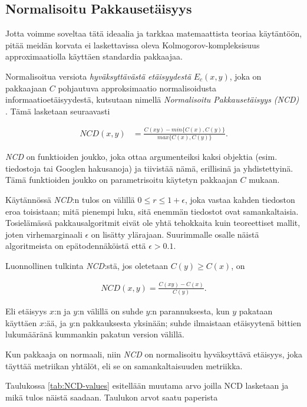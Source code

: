 \documentclass[12pt,finnish,draft]{tktltiki2}
\theoremstyle{definition}
\theoremstyle{remark}
\begin{document}
\subsection{Normalisoitu Pakkausetäisyys} %
\label{sub:normalisoitu_pakkausetaisyys}

  Jotta voimme soveltaa tätä ideaalia ja tarkkaa matemaattista teoriaa käytäntöön, pitää meidän korvata ei laskettavissa oleva Kolmogorov-kompleksisuus approximaatiolla käyttäen standardia pakkaajaa.

  Normalisoitua versiota \emph{hyväksyttävästä etäisyydestä} $E_c(x,y)$, joka on pakkaajaan $C$ pohjautuva approksimaatio normalisoidusta informaatioetäisyydestä, kutsutaan nimellä \emph{Normalisoitu Pakkausetäisyys (NCD)} \cite{CV05}.
  Tämä lasketaan seuraavasti

  \begin{align}
    NCD(x,y) &= \frac{C(xy)-min\{C(x),C(y)\}}{max\{C(x),C(y)\}}.
  \end{align}

  \emph{NCD} on funktioiden joukko, joka ottaa argumenteiksi kaksi objektia (esim. tiedostoja tai Googlen hakusanoja) ja tiivistää nämä, erillisinä ja yhdistettyinä.
  Tämä funktioiden joukko on parametrisoitu käytetyn pakkaajan $C$ mukaan.

  Käytännössä \emph{NCD}:n tulos on välillä $0 \leq r \leq 1+ \epsilon$, joka vastaa kahden tiedoston eroa toisistaan; mitä pienempi luku, sitä enemmän tiedostot ovat samankaltaisia.
  Tosielämässä pakkausalgoritmit eivät ole yhtä tehokkaita kuin teoreettiset mallit, joten virhemarginaali $\epsilon$ on lisätty ylärajaan.
  Suurimmalle osalle näistä algoritmeista on epätodennäköistä että  $\epsilon > 0.1$.

  Luonnollinen tulkinta \emph{NCD}:stä, jos oletetaan $C(y) \geq C(x)$, on

  \begin{align}
    NCD(x,y) = \frac{C(xy)-C(x)}{C(y)}.
 \end{align}

  Eli etäisyys $x$:n ja $y$:n välillä on suhde $y$:n parannuksesta, kun $y$ pakataan käyttäen $x$:ää, ja $y$:n pakkauksesta yksinään; suhde ilmaistaan etäisyytenä bittien lukumääränä kummankin pakatun version välillä.

  Kun pakkaaja on normaali, niin \emph{NCD} on normalisoitu hyväksyttävä etäisyys, joka täyttää metriikan yhtälöt, eli se on samankaltaisuuden metriikka.

  Taulukossa \ref{tab:NCD-values} esitellään muutama arvo joilla NCD lasketaan ja mikä tulos näistä saadaan. Taulukon arvot saatu paperista \cite{cebrian2005common}
\end{document}
